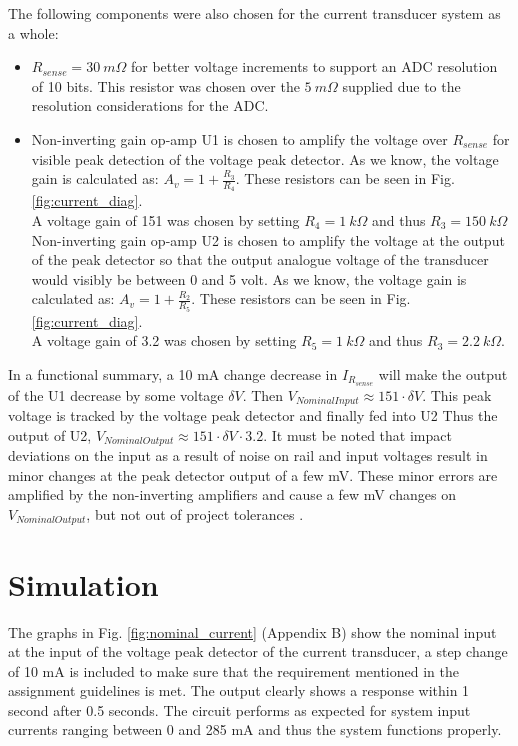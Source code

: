 The following components were also chosen for the current transducer system as a whole:
\begin{itemize}
    \item $R_{sense}=30 \ m\Omega$ for better voltage increments to support an ADC resolution of 10 bits. This resistor was chosen over the $5 \ m\Omega$ supplied due to the resolution considerations for the ADC.
    \item Non-inverting gain op-amp U1 is chosen to amplify the voltage over  $R_{sense}$ for visible peak detection of the voltage peak detector. As we know, the voltage gain is calculated as: $A_v=1+\frac{R_3}{R_4}$. These resistors can be seen in Fig. \ref{fig:current_diag}. \\A voltage gain of 151 was chosen by setting $R_4=1 \ k\Omega$ and thus $R_3=150 \ k\Omega$ \\Non-inverting gain op-amp U2 is chosen to amplify the voltage at the output of the peak detector so that the output analogue voltage of the transducer would visibly be between 0 and 5 volt. As we know, the voltage gain is calculated as: $A_v=1+\frac{R_2}{R_5}$. These resistors can be seen in Fig. \ref{fig:current_diag}. \\A voltage gain of 3.2 was chosen by setting $R_5=1 \ k\Omega$ and thus $R_3=2.2\ k\Omega$.
\end{itemize}

In a functional summary, a 10 mA change decrease in $I_{R_{sense}}$ will make the output of the U1 decrease by some voltage $\delta V$. Then $V_{Nominal Input} \approx151\cdot\delta V$. This peak voltage is tracked by the voltage peak detector and finally fed into U2 Thus the output of U2, $V_{Nominal Output} \approx151\cdot\delta V\cdot3.2$. It must be noted that impact deviations on the input as a result of noise on rail and input voltages result in minor changes at the peak detector output of a few mV. These minor errors are amplified by the non-inverting amplifiers \cite{non-inverting} and cause a few mV changes on $V_{Nominal Output}$, but not out of project tolerances \cite{assignment_2}.

\section{Simulation} \label{sec:simulation_current}

The graphs in Fig. \ref{fig:nominal_current} (Appendix B) show the nominal input at the input of the voltage peak detector of the current transducer, a step change of 10 mA is included to make sure that the requirement mentioned in the assignment guidelines \cite{assignment_2} is met. The output clearly shows a response within 1 second after 0.5 seconds. The circuit performs as expected for system input currents ranging between 0 and 285 \si{\milli\ampere} and thus the system functions properly.


